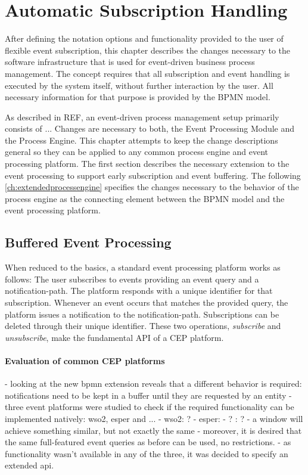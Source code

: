 \section{Automatic Subscription Handling}\label{ch:automaticsubscription}

After defining the notation options and functionality provided to the user of flexible event subscription, this chapter describes the changes necessary to the software infrastructure that is used for event-driven business process management.
The concept requires that all subscription and event handling is executed by the system itself, without further interaction by the user.
All necessary information for that purpose is provided by the BPMN model.

As described in REF, an event-driven process management setup primarily consists of ...
Changes are necessary to both, the Event Processing Module and the Process Engine. This chapter attempts to keep the change descriptions general so they can be applied to any common process engine and event processing platform.
The first section describes the necessary extension to the event processing to support early subscription and event buffering.
The following \autoref{ch:extendedprocessengine} specifies the changes necessary to the behavior of the process engine as the connecting element between the BPMN model and the event processing platform.


\subsection{Buffered Event Processing}\label{ch:bufferedcep}
When reduced to the basics, a standard event processing platform works as follows: The user subscribes to events providing an event query and a notification-path. The platform responds with a unique identifier for that subscription.
Whenever an event occurs that matches the provided query, the platform issues a notification to the notification-path. Subscriptions can be deleted through their unique identifier.
These two operations, \textit{subscribe} and \textit{unsubscribe}, make the fundamental API of a CEP platform.


\paragraph{Evaluation of common CEP platforms}
- looking at the new bpmn extension reveals that a different behavior is required: notifications need to be kept in a buffer until they are requested by an entity
- three event platforms were studied to check if the required functionality can be implemented natively: wso2, esper and ...
- wso2: ?
- esper: 
- ? : ?
- a window will achieve something similar, but not exactly the same
- moreover, it is desired that the same full-featured event queries as before can be used, no restrictions. 
- as functionality wasn't available in any of the three, it was decided to specify an extended api.

